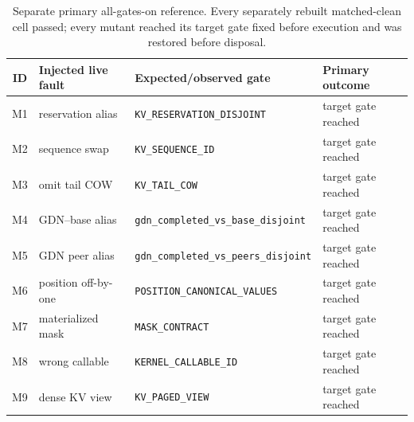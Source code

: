 \begin{table}[H]
\caption{Separate primary all-gates-on reference. Every separately rebuilt matched-clean cell passed; every mutant reached its target gate fixed before execution and was restored before disposal.}
\label{tab:rr2-mutants}
\centering\footnotesize
\begin{tabular}{@{}clll@{}}
\toprule
ID & Injected live fault & Expected/observed gate & Primary outcome \\
\midrule
M1 & reservation alias & \texttt{KV\_RESERVATION\_DISJOINT} & target gate reached \\ 
M2 & sequence swap & \texttt{KV\_SEQUENCE\_ID} & target gate reached \\ 
M3 & omit tail COW & \texttt{KV\_TAIL\_COW} & target gate reached \\ 
M4 & GDN--base alias & \texttt{gdn\_completed\_vs\_base\_disjoint} & target gate reached \\ 
M5 & GDN peer alias & \texttt{gdn\_completed\_vs\_peers\_disjoint} & target gate reached \\ 
M6 & position off-by-one & \texttt{POSITION\_CANONICAL\_VALUES} & target gate reached \\ 
M7 & materialized mask & \texttt{MASK\_CONTRACT} & target gate reached \\ 
M8 & wrong callable & \texttt{KERNEL\_CALLABLE\_ID} & target gate reached \\ 
M9 & dense KV view & \texttt{KV\_PAGED\_VIEW} & target gate reached \\ 
\bottomrule
\end{tabular}
\end{table}
